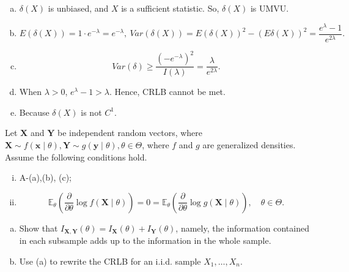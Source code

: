 \begin{solution}
    \begin{enumerate}[(a)]
        \item $\delta(X)$ is unbiased, and $X$ is a sufficient statistic. So, $\delta(X)$ is UMVU. 
        \item \[
            E(\delta(X))=1\cdot e^{-\lambda}=e^{-\lambda}, \ Var(\delta(X))=E(\delta(X))^2-(E\delta(X))^2=\frac{e^\lambda-1}{e^{2\lambda}}. 
        \]
        \item \[
            Var(\delta)\geqslant\frac{\left(-e^{-\lambda}\right)^2}{I(\lambda)}=\frac{\lambda}{e^{2\lambda}}.
        \]
        \item When $\lambda>0$, $e^{\lambda}-1>\lambda$. Hence, CRLB cannot be met. 
        \item Because $\delta(X)$ is not $C^1$. 
    \end{enumerate}
\end{solution}

\begin{ex}
    Let \(\mathbf{X}\) and \(\mathbf{Y}\) be independent random vectors, where \(\mathbf{X} \sim f(\mathbf{x} \mid \theta), \mathbf{Y} \sim g(\mathbf{y} \mid \theta), \theta \in \Theta\), where \(f\) and \(g\) are generalized densities. Assume the following conditions hold. 
    \begin{enumerate}[(i)]
        \item A-(a),(b), (c); 
        \item \[
            \mathbb{E}_{\theta}\left(\frac{\partial}{\partial \theta} \log f(\mathbf{X} \mid \theta)\right)=0=\mathbb{E}_{\theta}\left(\frac{\partial}{\partial \theta} \log g(\mathbf{X} \mid \theta)\right), \quad \theta \in \Theta. 
        \]
    \end{enumerate}
    \begin{enumerate}[(a)]
        \item Show that \(I_{\mathbf{X}, \mathbf{Y}}(\theta)=I_{\mathbf{X}}(\theta)+I_{\mathbf{Y}}(\theta)\), namely, the information contained in each subsample adds up to the information in the whole sample. 
        \item Use (a) to rewrite the CRLB for an i.i.d. sample \(X_{1}, \ldots, X_{n}\). 
    \end{enumerate}
\end{ex}


